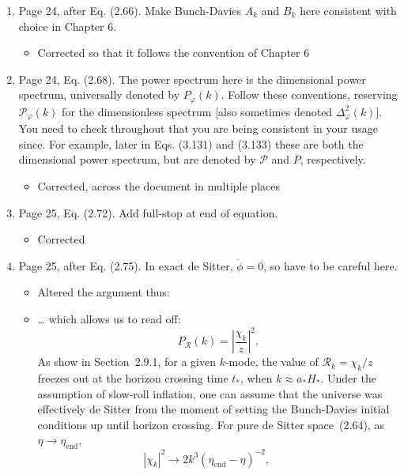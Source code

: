 \documentclass[11pt]{article}
\begin{document}
\begin{enumerate}
\begin{itemize}
  \end{itemize}
\item Page 24, after Eq. (2.66). Make Bunch-Davies $A_k$ and $B_k$
  here consistent with choice in Chapter 6.
  \begin{itemize}
      \item Corrected so that it follows the convention of Chapter 6
  \end{itemize}
\item Page 24, Eq. (2.68). The power spectrum here is the dimensional
  power spectrum, universally denoted by $P_{\varphi}(k)$. Follow
  these conventions, reserving $\mathcal{P}_\varphi(k)$ for the
  dimensionless spectrum [also sometimes denoted
  $\Delta_\varphi^2(k)$]. You need to check throughout that you are
  being consistent in your usage since. For example, later in
  Eqs. (3.131) and (3.133) these are both the dimensional power
  spectrum, but are denoted by $\mathcal{P}$ and $P$, respectively.
\begin{itemize}
    \item Corrected, across the document in multiple places
\end{itemize}
\item Page 25, Eq. (2.72). Add full-stop at end of equation.
  \begin{itemize}
    \item Corrected
  \end{itemize}
\item Page 25, after Eq. (2.75). In exact de Sitter, $\dot{\phi} = 0$,
  so have to be careful here.
  \begin{itemize}
      \item Altered the argument thus:
      \item \ldots 
which allows us to read off:
\begin{equation}
  P_\mathcal{R}(k) = {\left|\frac{\chi_k}{z}\right|}^2.
  \label{eqn:cos:power_spectrum_evaluation}
  \tag{2.74}
\end{equation}
As show in Section~2.9.1, for a given \(k\)-mode, the value of \(\mathcal{R}_k = \chi_k/z\) freezes out at the horizon crossing time \(t_*\), when \(k\approx a_*H_*\). Under the assumption of slow-roll inflation, one can assume that the universe was effectively de Sitter from the moment of setting the Bunch-Davies initial conditions up until horizon crossing. For pure de Sitter space~(2.64), as \(\eta\to\eta_\mathrm{end}\),
\begin{equation}
  |\chi_k|^2 \rightarrow 2k^3 {(\eta_\mathrm{end}-\eta)}^{-2},\qquad

\end{equation}
\end{itemize}
\end{enumerate}
\end{document}
